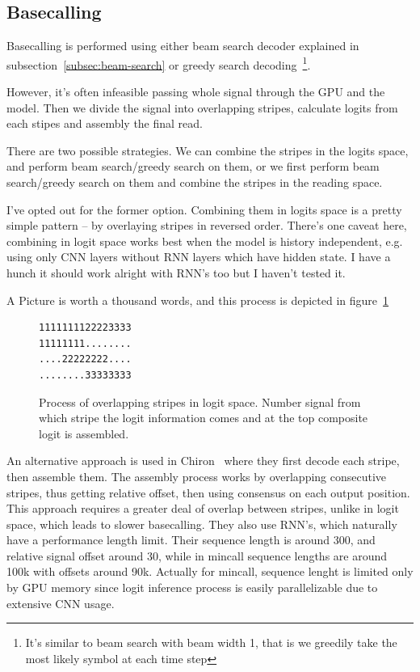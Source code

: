 \documentclass[times, utf8, diplomski, english]{fer}
\begin{document}
\subsection{Basecalling}
\label{subsec:basecalling}

Basecalling is performed using either beam search decoder explained in subsection~\ref{subsec:beam-search} or greedy search 
decoding~\footnote{It's similar to beam search with beam width 1, that is we greedily take the most likely symbol at each time step}.

However, it's often infeasible passing whole signal through the GPU and the model. 
Then we divide the signal into overlapping stripes, calculate logits from each stipes and assembly the final read. 

There are two possible strategies. We can combine the stripes in the logits space, and perform beam search/greedy search on them, 
or we first perform beam search/greedy search on them and combine the stripes in the reading space. 

I've opted out for the former option. 
Combining them in logits space is a pretty simple pattern -- by overlaying stripes in reversed order.
There's one caveat here, combining in logit space works best when the model is history independent, e.g.
using only CNN layers without RNN layers which have hidden state. I have a hunch it should work alright with RNN's too but I haven't tested it.

A Picture is worth a thousand words, and this process is depicted in figure~\ref{fg:logit_comp}

\begin{figure}
\label{fg:logit_comp}
\begin{center}
\begin{verbatim}
1111111122223333
11111111........
....22222222....
........33333333
\end{verbatim}
\caption{Process of overlapping stripes in logit space. Number signal from which stripe the logit information comes and at the top composite logit is assembled.}
\end{center}
\end{figure}

An alternative approach is used in Chiron~\citep{chiron_teng} where they first decode each stripe, then assemble them. 
The assembly process works by overlapping consecutive stripes, thus getting relative offset, then using consensus on each output position.
This approach requires a greater deal of overlap between stripes, unlike in logit space, which leads to slower basecalling.
They also use RNN's, which naturally have a performance length limit. 
Their sequence length is around 300, and relative signal offset around 30, 
while in mincall sequence lengths are around 100k with offsets around 90k. Actually for mincall, sequence lenght is limited only by GPU memory since logit inference process is easily parallelizable due to extensive CNN usage. 
\end{document}
